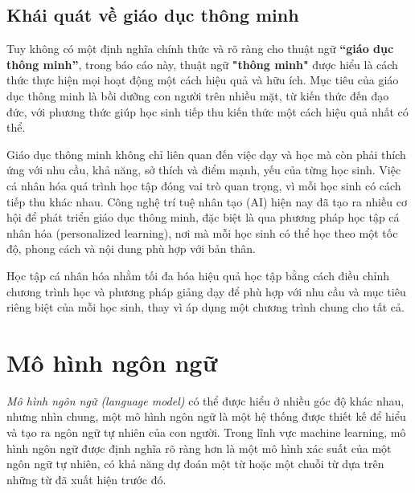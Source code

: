 \subsection{Khái quát về giáo dục thông minh}
\par Tuy không có một định nghĩa chính thức và rõ ràng cho thuật ngữ \textbf{“giáo dục thông minh”}, trong báo cáo này, thuật ngữ \textbf{"thông minh"} được hiểu là cách thức thực hiện mọi hoạt động một cách hiệu quả và hữu ích. Mục tiêu của giáo dục thông minh là bồi dưỡng con người trên nhiều mặt, từ kiến thức đến đạo đức, với phương thức giúp học sinh tiếp thu kiến thức một cách hiệu quả nhất có thể.

\par Giáo dục thông minh không chỉ liên quan đến việc dạy và học mà còn phải thích ứng với nhu cầu, khả năng, sở thích và điểm mạnh, yếu của từng học sinh. Việc cá nhân hóa quá trình học tập đóng vai trò quan trọng, vì mỗi học sinh có cách tiếp thu khác nhau. Công nghệ trí tuệ nhân tạo (AI) hiện nay đã tạo ra nhiều cơ hội để phát triển giáo dục thông minh, đặc biệt là qua phương pháp học tập cá nhân hóa (personalized learning), nơi mà mỗi học sinh có thể học theo một tốc độ, phong cách và nội dung phù hợp với bản thân.

\par Học tập cá nhân hóa nhằm tối đa hóa hiệu quả học tập bằng cách điều chỉnh chương trình học và phương pháp giảng dạy để phù hợp với nhu cầu và mục tiêu riêng biệt của mỗi học sinh, thay vì áp dụng một chương trình chung cho tất cả.
\section{Mô hình ngôn ngữ}
\par \emph{Mô hình ngôn ngữ (language model)} có thể được hiểu ở nhiều góc độ khác nhau, nhưng nhìn chung, một mô hình ngôn ngữ là một hệ thống được thiết kế để hiểu và tạo ra ngôn ngữ tự nhiên của con người. Trong lĩnh vực machine learning, mô hình ngôn ngữ được định nghĩa rõ ràng hơn là một mô hình xác suất của một ngôn ngữ tự nhiên, có khả năng dự đoán một từ hoặc một chuỗi từ dựa trên những từ đã xuất hiện trước đó.

